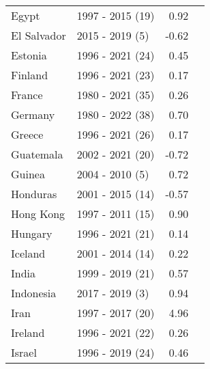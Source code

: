 \begin{table}[pos=h]
{{\begin{tabular}{llrr}
Egypt & 1997 - 2015 (19) & 0.92\\
El Salvador & 2015 - 2019 (5) & -0.62\\
\addlinespace
Estonia & 1996 - 2021 (24) & 0.45\\
Finland & 1996 - 2021 (23) & 0.17\\
France & 1980 - 2021 (35) & 0.26\\
Germany & 1980 - 2022 (38) & 0.70\\
Greece & 1996 - 2021 (26) & 0.17\\
\addlinespace
Guatemala & 2002 - 2021 (20) & -0.72\\
Guinea & 2004 - 2010 (5) & 0.72\\
Honduras & 2001 - 2015 (14) & -0.57\\
Hong Kong & 1997 - 2011 (15) & 0.90\\
Hungary & 1996 - 2021 (21) & 0.14\\
\addlinespace
Iceland & 2001 - 2014 (14) & 0.22\\
India & 1999 - 2019 (21) & 0.57\\
Indonesia & 2017 - 2019 (3) & 0.94\\
Iran & 1997 - 2017 (20) & 4.96\\
Ireland & 1996 - 2021 (22) & 0.26\\
\addlinespace
Israel & 1996 - 2019 (24) & 0.46\\
\bottomrule \end{tabular}
}

}
\end{table}
